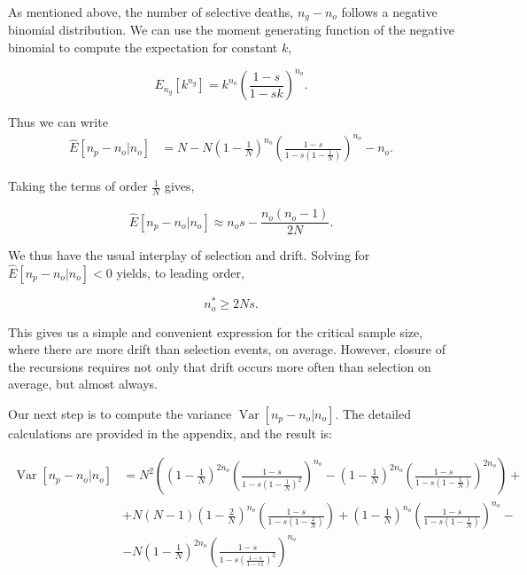 \documentclass[review]{elsarticle}
\begin{document}
As mentioned above, the number of selective deaths, $n_g-n_o$ follows a negative binomial distribution.
 We can use the moment generating function of the negative binomial to compute the expectation for
constant $k$,

\begin{equation}
E_{n_g}[k^{n_g}] = k^{n_o}  \left(\frac{1-s}{1-sk}\right)^{n_o}.
\label{eq:identity}
\end{equation} 

Thus we can write 
\begin{align}
  \label{eq:lineages-exact}
  \hat{E}[n_p -n_o | n_o] &= N-N\left( 1 - \frac{1}{N} \right)^{n_o}\left( \frac{1-s}{1-s \left( 1 - \frac{1}{N} \right)}\right)^{n_o}-n_o.
\end{align}

Taking the terms of order $\frac{1}{N}$ gives,

\begin{equation*}
    \label{eq:lineages-approx}
    \hat{E}[n_p-n_o | n_o] \approx n_os - \frac{n_o (n_o-1) }{2N}. 
\end{equation*}

We thus have the usual interplay of selection and drift. Solving for $ \hat{E}[n_p -n_o | n_o]<0$
yields, to leading order,

\begin{equation}
  \label{eq:critical-sample}
  n_o^* \ge 2Ns.
\end{equation}

This gives us a simple and convenient expression for the critical sample size, where there are more
drift than selection events, on average. However, closure of the recursions requires not only that
drift occurs more often than selection on average, but almost always.

Our next step is to compute the variance $\operatorname{Var}[n_p-n_o | n_o].$ The detailed
calculations are provided in the appendix, and the result is:

\newcommand{\vara}[1]{\left(1-\frac{#1}{N}\right)}
\newcommand{\varb}[1]{\left(\frac{1-s}{1-s #1}\right)}

\begin{equation}
  \begin{aligned}
    \operatorname{Var}[n_p-n_o | n_o] &=
    N^2\left( \vara{1}^{2n_o}\varb{\vara{1}^2}^{n_o}-\vara{1}^{2n_o}\varb{\vara{1}}^{2n_o} \right) + \\
    &+ N(N-1)\vara{2}^{n_o}\varb{\vara{2}} + \vara{1}^{n_o}\varb{\vara{1}}^{n_o} - \\
    &- N\vara{1}^{2n_o} \varb{\varb{1}^{2}}^{n_o}
  \end{aligned}
\end{equation}
\end{document}
